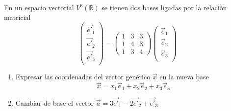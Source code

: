 \begin{problema}{\cite[8p345]{palacios}}{
	En un espacio vectorial $V^3(\mathbb{R})$ se tienen dos bases ligadas por la relación matricial
	$$\begin{pmatrix}
		\vec{e'}_1 \\
		\vec{e'}_2 \\
		\vec{e'}_3 \\
	\end{pmatrix}
	=
	\begin{pmatrix}
		1 & 3 & 3 \\
		1 & 4 & 3 \\
		1 & 3 & 4
	\end{pmatrix}
	\begin{pmatrix}
		\vec{e}_1 \\
		\vec{e}_2 \\
		\vec{e}_3 \\
	\end{pmatrix}
	$$
	\begin{enumerate}
		\item Expresar las coordenadas del vector genérico $\vec{x}$ en la nueva base
			$$\vec{x}=x_1\vec{e}_1+x_2\vec{e}_2+x_3\vec{e}_3$$
		\item Cambiar de base el vector $\vec{a}=3\vec{e'}_1-2\vec{e'}_2+\vec{e'}_3$
	\end{enumerate}
	}

\end{problema}
